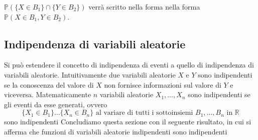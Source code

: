 
$\mathbb{P}(\{X \in B_1\} \cap \{Y \in B_2\})$ verrà scritto nella forma nella forma $\mathbb{P}(X \in B_1, Y \in B_2)$.
\subsection{Indipendenza di variabili aleatorie}
Si può estendere il concetto di indipendenza di eventi a quello di indipendenza di variabili aleatorie. Intuitivamente due variabili aleatorie $X$ e $Y$ sono indipendenti se la conoscenza del valore di $X$ non fornisce informazioni sul valore di $Y$ e viceversa. Matematicamente $n$ variabili aleatorie $X_1, \dots, X_n$ sono indipendenti se gli eventi da esse generati, ovvero
\[
    \{X_1\in B_1\} \dots \{X_n\in B_n\} \text{ al variare di tutti i sottoinsiemi } B_1, \dots, B_n \text{ in }\mathbb{R}
\]
sono indipendenti
Concludiamo questa sezione con il seguente risultato, in cui si aﬀerma che funzioni di variabili aleatorie indipendenti sono indipendenti

